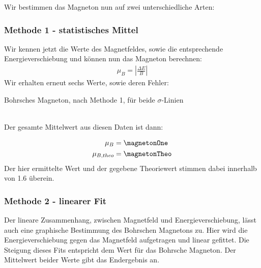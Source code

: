         Wir bestimmen das Magneton nun auf zwei unterschiedliche Arten:

        \subsubsection{Methode 1 - statistisches Mittel}
          Wir kennen jetzt die Werte des Magnetfeldes, sowie die entsprechende Energieverschiebung und können nun das Magneton berechnen:
          \begin{align}
            \mu_B=\left| \frac{\Delta E}{B} \right|
          \end{align}
          Wir erhalten erneut sechs Werte, sowie deren Fehler:
          \begin{table}[H]
            \centering
            
            \caption{Bohrsches Magneton, nach Methode 1, für beide $\sigma$-Linien}
            \label{tab::2}
          \end{table}~\\
          Der gesamte Mittelwert aus diesen Daten ist dann:

          \begin{align}
            \mu_B         &= \magnetonOne\\
            \mu_{B, theo} &= \magnetonTheo %
          \end{align}
          Der hier ermittelte Wert und der gegebene Theoriewert stimmen dabei innerhalb von \SI{1.6}{\sigma} überein.

        \subsubsection{Methode 2 - linearer Fit}
        Der lineare Zusammenhang, zwischen Magnetfeld und Energieverschiebung, lässt auch eine graphische Bestimmung des Bohrschen Magnetons zu. Hier wird die Energieverschiebung gegen das Magnetfeld aufgetragen und linear gefittet. Die Steigung dieses Fits entspricht dem Wert für das Bohrsche Magneton. Der Mittelwert beider Werte gibt das Endergebnis an.

